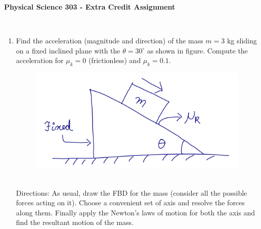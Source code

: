 \documentclass[10pt]{article}
\date{2014-6-22}
\begin{document}
\begin{center}
\begin{Large}\textbf{Physical Science 303 - Extra Credit Assignment}\end{Large} \\
\smallskip
\end{center}

 \begin{enumerate}
\item Find the acceleration (magnitude and direction) of the mass $m=3$ kg sliding on a fixed inclined plane with the $\theta=30^\circ$ as shown in figure.  Compute the acceleration for $\mu_k=0$ (frictionless) and $\mu_k=0.1$.
\begin{figure}[h]
\includegraphics[scale=.5]{inclinedextra}
\centering
\end{figure}\\
Directions: As usual, draw the FBD for the mass (consider all the possible forces acting on it).  Choose a convenient set of axis and resolve the forces along them.  Finally apply the Newton's laws of motion for both the axis and find the resultant motion of the mass.
\end{enumerate}
\end{document}
